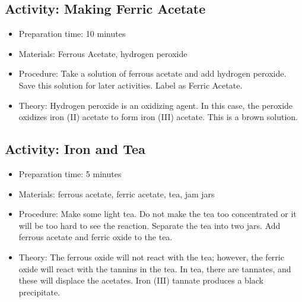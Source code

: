 \begin{itemize}
{\begin{itemize}
\begin{itemize}
{\subsection{Activity: Making Ferric Acetate}
\begin{itemize}
\item{Preparation time: 10 minutes}
\item{Materials: Ferrous Acetate, hydrogen peroxide}
\item{Procedure: Take a solution of ferrous acetate and add hydrogen peroxide. Save this solution for later activities. Label as Ferric Acetate.}
\item{Theory: Hydrogen peroxide is an oxidizing agent. In this case, the peroxide oxidizes iron (II) acetate to form iron (III) acetate. This is a brown solution.}
\end{itemize}

\subsection{Activity: Iron and Tea}
\begin{itemize}
\item{Preparation time: 5 minutes}
\item{Materials: ferrous acetate, ferric acetate, tea, jam jars}
\item{Procedure: Make some light tea. Do not make the tea too concentrated or it will be too hard to see the reaction. Separate the tea into two jars. Add ferrous acetate and ferric oxide to the tea.}
\item{Theory: The ferrous oxide will not react with the tea; however, the ferric oxide will react with the tannins in the tea. In tea, there are tannates, and these will displace the acetates. Iron (III) tannate produces a black precipitate.}
\end{itemize}

}
\end{itemize}
\end{itemize}}
\end{itemize}
